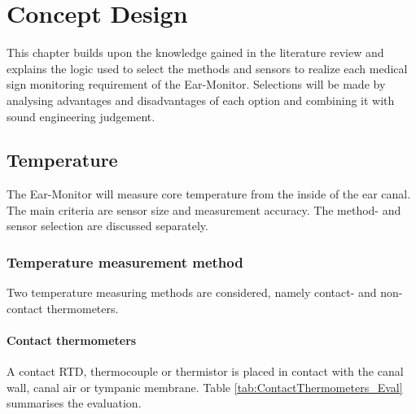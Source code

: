 \chapter{Concept Design}
\label{chp:ConceptDesign}
This chapter builds upon the knowledge gained in the literature review and explains the logic used to select the methods and sensors to realize each medical sign monitoring requirement of the Ear-Monitor. Selections will be made by analysing advantages and disadvantages of each option and combining it with sound engineering judgement.

\section{Temperature}
The Ear-Monitor will measure core temperature from the inside of the ear canal. The main criteria are sensor size and measurement accuracy. The method- and sensor selection are discussed separately.

\subsection{Temperature measurement method}
Two temperature measuring methods are considered, namely contact- and non-contact thermometers.

\subsubsection{Contact thermometers}
A contact RTD, thermocouple or thermistor is placed in contact with the canal wall, canal air or tympanic membrane. Table \ref{tab:ContactThermometers_Eval} summarises the evaluation.

